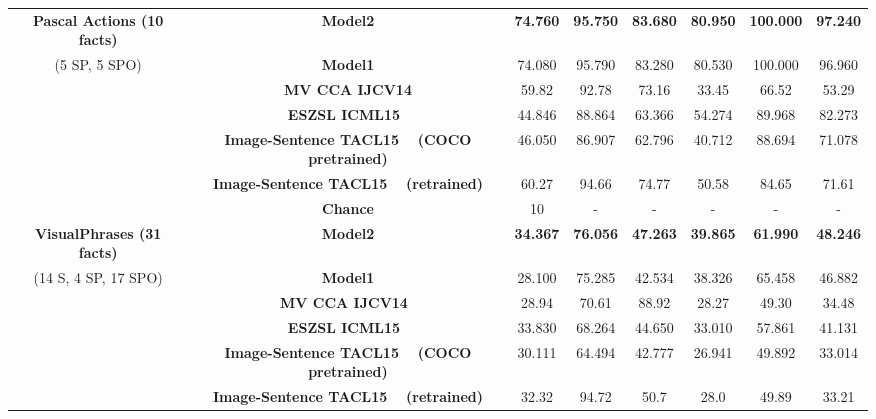 \documentclass[runningheads]{llncs}
\begin{document}
{\begin{tabular}{|c|c|ccc|ccc|}
  \textbf{Pascal Actions (10 facts)}        & \textbf{Model2} & \textbf{74.760} & \textbf{95.750 }& \textbf{83.680} & \textbf{80.950} & \textbf{100.000} & \textbf{97.240}  \\
     (5 SP,  5 SPO)       & \textbf{Model1} & 74.080 & 95.790 & 83.280 & 80.530 & 100.000 & 96.960 \\
                    & \textbf{MV CCA IJCV14} & 59.82 & 92.78 & 73.16 & 33.45 & 66.52 & 53.29 \\
          & \textbf{ESZSL ICML15~\cite{romera2015embarrassingly}} & 44.846 & 88.864 & 63.366 & 54.274 & 89.968 & 82.273  \\
       & \textbf{Image-Sentence TACL15  ~\cite{kiros2014unifying} (COCO pretrained)} & 46.050 & 86.907 & 62.796 & 40.712 & 88.694 & 71.078  \\
              & \textbf{Image-Sentence TACL15  ~\cite{kiros2014unifying} (retrained) } & 60.27 & 94.66 & 74.77 & 50.58 & 84.65 & 71.61  \\
              \textbf{} & \textbf{Chance} & 10 & - & - & - & - & - \\
                  \hline
   \textbf{VisualPhrases (31 facts)}    & \textbf{Model2} & \textbf{34.367} & \textbf{76.056} & \textbf{47.263} & \textbf{39.865} & \textbf{61.990} & \textbf{48.246} \\
 (14 S, 4 SP, 17 SPO)   & \textbf{Model1} & 28.100 & 75.285 & 42.534 & 38.326 & 65.458 & 46.882  \\
     & \textbf{MV CCA IJCV14~\cite{gong2014multi}} & 28.94 & 70.61 & 88.92 & {28.27} & {49.30} & {34.48} \\
 &   \textbf{ESZSL ICML15~\cite{romera2015embarrassingly}} & 33.830 & 68.264 & 44.650 & 33.010 & 57.861 & 41.131  \\
  &  \textbf{Image-Sentence TACL15  ~\cite{kiros2014unifying} (COCO pretrained)} & 30.111 & 64.494 & 42.777 & 26.941 & 49.892 & 33.014 \\
      &  \textbf{Image-Sentence TACL15   ~\cite{kiros2014unifying} (retrained)} & 32.32 & 94.72 & 50.7 & 28.0 & 49.89 & 33.21 \\

\end{tabular}}
\end{document}
